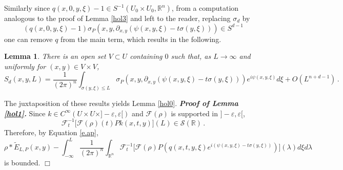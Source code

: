\documentclass[10pt,twoside]{article}
\newcommand{\fou}{\mathcal{F}}
\newcommand{\eps}{\varepsilon}
\newcommand{\R}{\mathbb{R}}
\newenvironment{prf}[1][]
{\vskip 2mm  {\it \bf Proof#1. }}{$\Box$ \vskip 2mm}
\numberwithin{theorem}{section}
\newtheorem{lemma}[theorem]{Lemma}
\begin{document}
Similarly since $q(x,0,y,\xi)-1\in S^{-1}(U_0\times U_0,\R^n)$, from a computation analogous to the proof of Lemma \ref{hol3} and left to the reader, replacing $\sigma_d$ by
\[(q(x,0,y,\xi)-1)\sigma_P(x,y,\partial_{x,y}(\psi(x,y,\xi)-t\sigma(y,\xi)))\in S^{d-1}\]
one can remove $q$ from the main term, which results in the following.
\begin{lemma}\label{hol4}
There is an open set $V\subset U$ containing $0$ such that, as $L\rightarrow\infty$ and uniformly for $(x,y)\in V\times V$,
\[
S_d(x,y,L)=\frac{1}{(2\pi)^n}\int_{\sigma(y,\xi)\leq L} \sigma_P(x,y,\partial_{x,y}(\psi(x,y,\xi)-t\sigma(y,\xi))) e^{i\psi(x,y,\xi)}d\xi + O(L^{n+d-1})\,.
\]
\end{lemma}
The juxtaposition of these results yields Lemma \ref{hol0}.
\begin{prf}[ of Lemma \ref{hol1}]
Since $k\in C^\infty(U\times U\times]-\eps,\eps[)$ and $\fou(\rho)$ is supported in $]-\eps,\eps[$,
\[
\fou^{-1}_t\big[\fou(\rho)(t)Pk(x,t,y)\big](L)\in\mathcal{S}(\R)\, .
\]
Therefore, by Equation \eqref{e.ap},
\[
\rho*\tilde{E}_{L,P}(x,y)-\int_{-\infty}^L\frac{1}{(2\pi)^n}\int_{\R^n}\fou^{-1}_t\Big[\fou(\rho)P\left(q(x,t,y,\xi)e^{i(\psi(x,y,\xi)-t \sigma(y,\xi))}\right)\Big](\lambda)d\xi d\lambda
\]
is bounded.
\end{prf}
\end{document}
